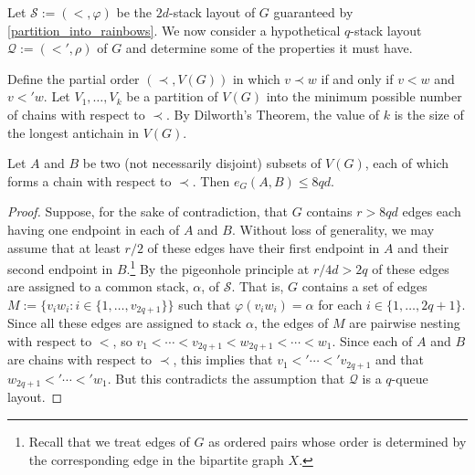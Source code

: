 \documentclass{patmorin}
\begin{document}
Let $\mathcal{S}:=(<,\varphi)$ be the $2d$-stack layout of $G$ guaranteed by \cref{partition_into_rainbows}.  We now consider a hypothetical $q$-stack layout $\mathcal{Q}:=(<',\rho)$ of $G$ and determine some of the properties it must have.

Define the partial order $(\prec,V(G))$ in which $v\prec w$ if and only if $v < w$ and $v <' w$.  Let $V_1,\ldots,V_k$ be a partition of $V(G)$ into the minimum possible number of chains with respect to $\prec$.  By Dilworth's Theorem, the value of $k$ is the size of the longest antichain in $V(G)$.

\begin{lem}\label{few_edges_between_sets}
  Let $A$ and $B$ be two (not necessarily disjoint) subsets of $V(G)$, each of which forms a chain with respect to $\prec$.  Then $e_G(A,B)\le 8qd$.
\end{lem}

\begin{proof}
  Suppose, for the sake of contradiction, that $G$ contains $r > 8qd$ edges each having one endpoint in each of $A$ and $B$.  Without loss of generality, we may assume that at least $r/2$ of these edges have their first endpoint in $A$ and their second endpoint in $B$.\footnote{Recall that we treat edges of $G$ as ordered pairs whose order is determined by the corresponding edge in the bipartite graph $X$.}  By the pigeonhole principle at $r/4d>2q$ of these edges are assigned to a common stack, $\alpha$, of $\mathcal{S}$.  That is, $G$ contains a set of edges $M:=\{v_iw_i:i\in\{1,\ldots,v_{2q+1}\}\}$ such that $\varphi(v_iw_i)=\alpha$ for each $i\in\{1,\ldots,2q+1\}$.  Since all these edges are assigned to stack $\alpha$, the edges of $M$ are pairwise nesting with respect to $<$, so $v_1<\cdots<v_{2q+1} < w_{2q+1}<\cdots<w_1$.  Since each of $A$ and $B$ are chains with respect to $\prec$, this implies that $v_1<'\cdots<'v_{2q+1}$ and that $w_{2q+1}<'\cdots<'w_{1}$.  But this  contradicts the assumption that $\mathcal{Q}$ is a $q$-queue layout.
\end{proof}
\end{document}
